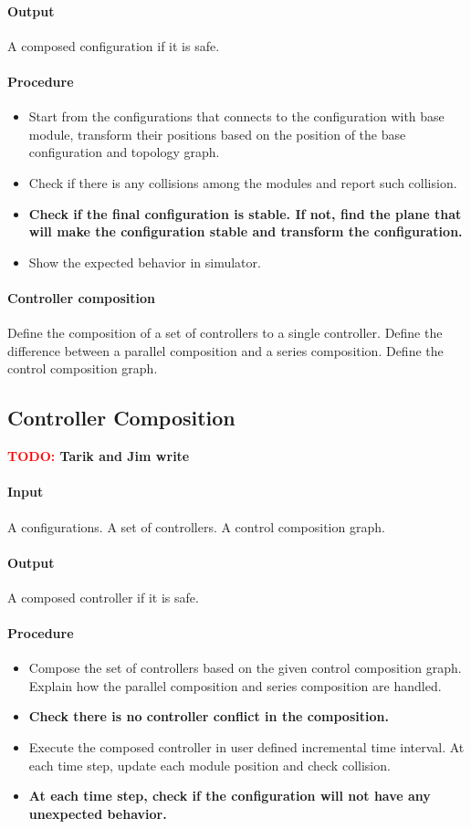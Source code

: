 \documentclass[conference]{IEEEtran}
\newcommand{\TODO}[1]{ {\bf \textcolor{red}{TODO:} #1 }}
\begin{document}
\paragraph{Output}
A composed configuration if it is safe.
\paragraph{Procedure}
\begin{itemize}
\item Start from the configurations that connects to the configuration with base module, transform their positions based on the position of the base configuration and topology graph.
\item Check if there is any collisions among the modules and report such collision.
\item \textbf{Check if the final configuration is stable. If not, find the plane that will make the configuration stable and transform the configuration.}
\item Show the expected behavior in simulator.
\end{itemize}

\paragraph{Controller composition}
Define the composition of a set of controllers to a single controller. Define the difference between a parallel composition and a series composition. Define the control composition graph.

\subsection{Controller Composition}
\TODO{Tarik and Jim write}
\paragraph{Input}
A configurations. A set of controllers. A control composition graph.
\paragraph{Output}
A composed controller if it is safe.
\paragraph{Procedure}
\begin{itemize}
\item Compose the set of controllers based on the given control composition graph. Explain how the parallel composition and series composition are handled.
\item\textbf{Check there is no controller conflict in the composition.}
\item Execute the composed controller in user defined incremental time interval. At each time step, update each module position and check collision.
\item \textbf{At each time step, check if the configuration will not have any unexpected behavior.}
\end{itemize}
\end{document}
